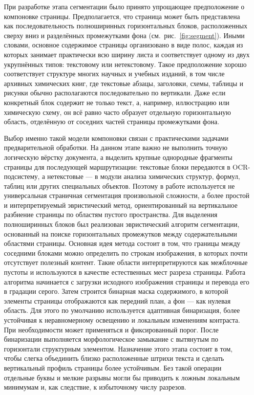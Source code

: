 При разработке этапа сегментации было принято упрощающее предположение о компоновке страницы. Предполагается, что страница может быть представлена как последовательность полноширинных горизонтальных блоков, расположенных сверху вниз и разделённых промежутками фона (см.~рис.~\ref{fig:segment}). Иными словами, основное содержимое страницы организовано в виде полос, каждая из которых занимает практически всю ширину листа и соответствует одному из двух укрупнённых типов: текстовому или нетекстовому.
Такое предположение хорошо соответствует структуре многих научных и учебных изданий, в том числе архивных химических книг, где текстовые абзацы, заголовки, схемы, таблицы и рисунки обычно располагаются последовательно по вертикали.
Даже если конкретный блок содержит не только текст, а, например, иллюстрацию или химическую схему, он всё равно часто образует отдельную горизонтальную область, отделённую от соседних частей страницы промежутками фона.

Выбор именно такой модели компоновки связан с практическими задачами предварительной обработки. На данном этапе важно не выполнить точную логическую вёрстку документа, а выделить крупные однородные фрагменты страницы для последующей маршрутизации: текстовые блоки передаются в OCR-подсистему, а нетекстовые --- в модули анализа химических структур, формул, таблиц или других специальных объектов. Поэтому в работе используется не универсальная страничная сегментация произвольной сложности, а более простой и интерпретируемый эвристический метод, ориентированный на вертикальное разбиение страницы по областям пустого пространства.
Для выделения полноширинных блоков был реализован эвристический алгоритм сегментации, основанный на поиске горизонтальных промежутков между содержательными областями страницы. Основная идея метода состоит в том, что границы между соседними блоками можно определить по строкам изображения, в которых почти отсутствует полезный контент. Такие области интерпретируются как межблочные пустоты и используются в качестве естественных мест разреза страницы.
Работа алгоритма начинается с загрузки исходного изображения страницы и перевода его в градации серого. Затем строится бинарная маска содержимого, в которой элементы страницы отображаются как передний план, а фон --- как нулевая область. Для этого по умолчанию используется адаптивная бинаризация, более устойчивая к неравномерному освещению и локальным изменениям контраста. При необходимости может применяться и фиксированный порог.
После бинаризации выполняется морфологическое замыкание с вытянутым по горизонтали структурным элементом. Назначение этого этапа состоит в том, чтобы слегка объединить близко расположенные штрихи текста и сделать вертикальный профиль страницы более устойчивым. Без такой операции отдельные буквы и мелкие разрывы могли бы приводить к ложным локальным минимумам и, как следствие, к избыточному числу разрезов.

